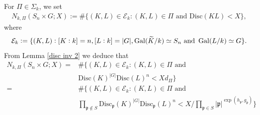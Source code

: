 \documentclass[11pt]{amsart}
\newcommand{\fp}{\mathfrak{p}}
\newcommand{\disc}{\mathrm{Disc}}
\newcommand{\op}[1]{\operatorname{#1}}
\numberwithin{equation}{section}
\begin{document}
For $\Pi \in \Sigma_k$, we set
\begin{align}\label{N k Pi}
    N_{k,\Pi}(S_n\times G; X):= \#\{(K,L) \in \mathcal{E}_k: (K,L) \in \Pi\text{ and } \disc(KL) < X \},
\end{align}
where \begin{equation}\label{mathcal{E}_k}\mathcal{E}_k:= \{(K,L): [K:k]= n, [L:k] = |G|, \op{Gal}(\widetilde{K}/k) \simeq S_n\text{ and } \op{Gal}(L/k) \simeq G\}.\end{equation} From Lemma \ref{disc inv 2} we deduce that
\begin{equation}\label{imp eqn}
    \begin{split}
         N_{k,\Pi}(S_n\times G; X)=& \#\{(K,L) \in \mathcal{E}_k: (K,L) \in \Pi \text{ and }\\
          & \disc(K)^{|G|}\disc(L)^n < X d_{\Pi} \}\\
         =& \#\{(K,L)\in \mathcal{E}_k: (K,L) \in \Pi \text{ and }\\
         & \prod_{\fp\notin S}\disc_{\fp}(K)^{|G|}\disc_{\fp}(L)^n < {X}/{\prod_{\fp\in S}|\fp|^{\exp(h_{\fp},g_{\fp})}}\}
\end{split}
\end{equation}
\end{document}
